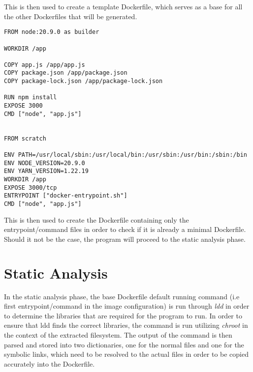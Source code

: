 This is then used to create a template Dockerfile, which serves as a base for all the other Dockerfiles that will be generated.

\lstset{language=Dockerfile,caption=Dockerfile.minimal.template,label=lst:template-minimal-dockerfile}
\begin{lstlisting}
FROM node:20.9.0 as builder

WORKDIR /app

COPY app.js /app/app.js
COPY package.json /app/package.json
COPY package-lock.json /app/package-lock.json

RUN npm install
EXPOSE 3000
CMD ["node", "app.js"]


FROM scratch

ENV PATH=/usr/local/sbin:/usr/local/bin:/usr/sbin:/usr/bin:/sbin:/bin
ENV NODE_VERSION=20.9.0
ENV YARN_VERSION=1.22.19
WORKDIR /app
EXPOSE 3000/tcp
ENTRYPOINT ["docker-entrypoint.sh"]
CMD ["node", "app.js"]
\end{lstlisting}

This is then used to create the Dockerfile containing only the entrypoint/command files in order to check if it is already a minimal Dockerfile.
Should it not be the case, the program will proceed to the static analysis phase.

\section{Static Analysis}
In the static analysis phase, the base Dockerfile default running command (i.e first entrypoint/command in the image configuration) is run through \textit{ldd} in order to determine 
the libraries that are required for the program to run. In order to ensure that ldd finds the correct libraries, the command is run utilizing \textit{chroot} in the context of the 
extracted filesystem.
The output of the command is then parsed and stored into two dictionaries, one for the normal files and one for the symbolic links, which need to be resolved to the actual files in order to 
be copied accurately into the Dockerfile.

